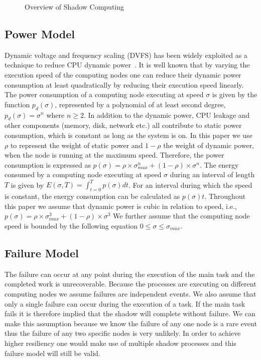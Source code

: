 \begin{figure}[hHtb]
\centering
{}
\caption { Overview of Shadow Computing }
\label{shadow_overview}
\end{figure}


\subsection{Power Model}
\label{power_model}
Dynamic voltage and frequency scaling
(DVFS) has
been widely exploited as a technique to reduce CPU dynamic power~\cite{flautner_2002_APS,pillai_2001_sosp}.
It is well known that by varying the execution speed of the computing
nodes one can reduce their dynamic power consumption at least quadratically by
reducing their execution speed linearly. The power consumption of a
computing node executing at speed $\sigma$ is given by the function
$p_d(\sigma)$, represented by a polynomial of at least second degree,
$p_d(\sigma)=\sigma^n$ where $n\geq2$. 
In addition to the dynamic power, CPU leakage and other components
(memory, disk, network etc.) all contribute to static power
consumption, which is constant as long as the system is on. In this paper we
use $\rho$ to represent the weight of static power and $1-\rho$ the weight 
of dynamic power, when the node is running at the maximum speed.
Therefore, the power consumption is expressed as $p(\sigma)=\rho \times \sigma_{max}^n + (1-\rho)\times \sigma^n$.
The energy consumed by a
computing node executing at speed $\sigma$ during an interval of
length $T$ is given by $E(\sigma,T)=\int_{t=0}^T
p(\sigma)dt$. For an interval during which the speed is constant, the 
energy consumption can be calculated as $p(\sigma)t$. Throughout this paper
we assume that dynamic power is cubic in relation to speed, i.e., 
$p(\sigma)=\rho \times \sigma_{max}^3 + (1-\rho)\times \sigma^3$
We further assume that the computing node speed is bounded by the
following equation $0\leq\sigma\leq\sigma_{max}$.

\subsection{Failure Model}
\label{failure_model}

The failure can occur at any point during the execution of the main
task and the completed work is unrecoverable. Because the processes
are executing on different computing nodes we assume failures are
independent events. We also assume that only a single failure can
occur during the execution of a task. If the main task fails it is
therefore implied that the shadow will complete without failure. We
can make this assumption because we know the failure of any one node
is a rare event thus the failure of any two specific nodes is very
unlikely. In order to achieve higher resiliency one
would make use of multiple shadow processes and this failure model
will still be valid.

